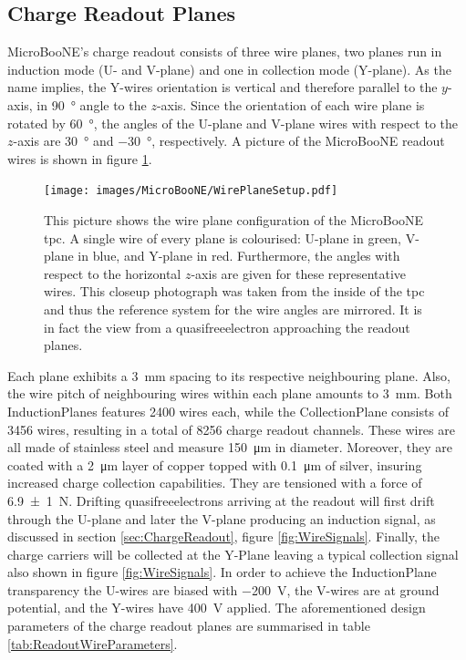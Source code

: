 \subsection{Charge Readout Planes}
MicroBooNE's charge readout consists of three wire planes, two planes run in induction mode (U- and V-plane) and one in collection mode (Y-plane). As the name implies, the Y-wires orientation is vertical and therefore parallel to the $y$-axis, \ie in \SI{90}{\degree} angle to the $z$-axis. Since the orientation of each wire plane is rotated by \SI{60}{\degree}, the angles of the U-plane and V-plane wires with respect to the $z$-axis are \SI{30}{\degree} and \SI{-30}{\degree}, respectively. A picture of the MicroBooNE readout wires is shown in figure \ref{fig:WirePlaneSetup}. \begin{figure}[htbp]
    \centering
    \texttt{[image: images/MicroBooNE/WirePlaneSetup.pdf]}
    \caption[Wire Plane Configuration of MicroBooNE]{This picture shows the wire plane configuration of the MicroBooNE \gls{tpc}. A single wire of every plane is colourised: U-plane in green, V-plane in blue, and Y-plane in red. Furthermore, the angles with respect to the horizontal $z$-axis are given for these representative wires. This closeup photograph was taken from the inside of the \gls{tpc} and thus the reference system for the wire angles are mirrored. It is in fact the view from a \gls{quasifreeelectron} approaching the readout planes.}
    \label{fig:WirePlaneSetup}
\end{figure}
Each plane exhibits a \SI{3}{\milli\metre} spacing to its respective neighbouring plane. Also, the wire pitch of neighbouring wires within each plane amounts to \SI{3}{\milli\metre}. Both \glspl{InductionPlane} features \num{2400} wires each, while the \gls{CollectionPlane} consists of \num{3456} wires, resulting in a total of \num{8256} charge readout channels. These wires are all made of stainless steel and measure \SI{150}{\micro\metre} in diameter. Moreover, they are coated with a \SI{2}{\micro\metre} layer of copper topped with \SI{0.1}{\micro\metre} of silver, insuring increased charge collection capabilities. They are tensioned with a force of \SI{6.9(10)}{\newton}. Drifting \glspl{quasifreeelectron} arriving at the readout will first drift through the U-plane and later the V-plane producing an induction signal, as discussed in section \ref{sec:ChargeReadout}, figure \ref{fig:WireSignals}. Finally, the charge carriers will be collected at the Y-Plane leaving a typical collection signal also shown in figure \ref{fig:WireSignals}. In order to achieve the \gls{InductionPlane} transparency the U-wires are biased with \SI{-200}{\volt}, the V-wires are at ground potential, and the Y-wires have \SI{400}{\volt} applied. The aforementioned design parameters of the charge readout planes are summarised in table \ref{tab:ReadoutWireParameters}.
